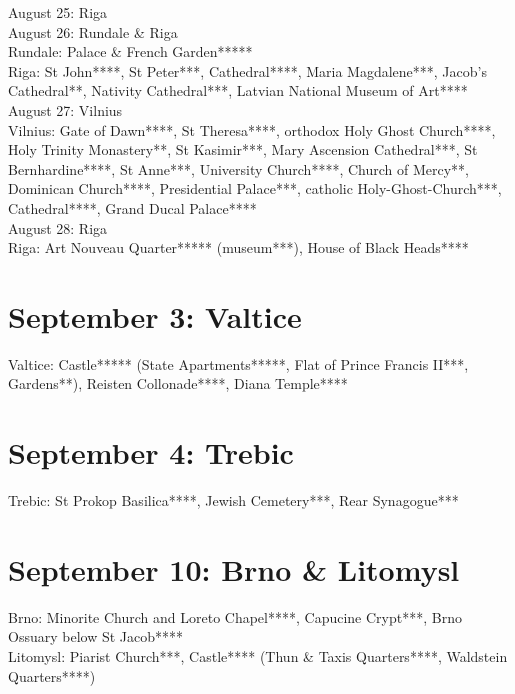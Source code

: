 August 25: Riga\\


August 26: Rundale \& Riga\\

Rundale: Palace \& French Garden*****\\
Riga: St John****, St Peter***, Cathedral****, Maria Magdalene***, Jacob's Cathedral**, Nativity Cathedral***, Latvian National Museum of Art****\\

August 27: Vilnius\\

Vilnius: Gate of Dawn****, St Theresa****, orthodox Holy Ghost Church****, Holy Trinity Monastery**, St Kasimir***, Mary Ascension Cathedral***, St Bernhardine****, St Anne***, University Church****,
Church of Mercy**, Dominican Church****, Presidential Palace***, catholic Holy-Ghost-Church***, Cathedral****, Grand Ducal Palace****\\

August 28: Riga\\

Riga: Art Nouveau Quarter***** (museum***), House of Black Heads****\\

\section{September 3:  Valtice}
\label{2022:Valtice}

Valtice: Castle***** (State Apartments*****, Flat of Prince Francis II***, Gardens**), Reisten Collonade****, Diana Temple****

\section{September 4:  Trebic}
\label{2022:Trebic}

Trebic: St Prokop Basilica****, Jewish Cemetery***, Rear Synagogue***\\

\section{September 10:  Brno \& Litomysl}
\label{2022:Litomysl}

Brno: Minorite Church and Loreto Chapel****, Capucine Crypt***, Brno Ossuary below St Jacob****\\
Litomysl: Piarist Church***, Castle**** (Thun \& Taxis Quarters****, Waldstein Quarters****)\\

